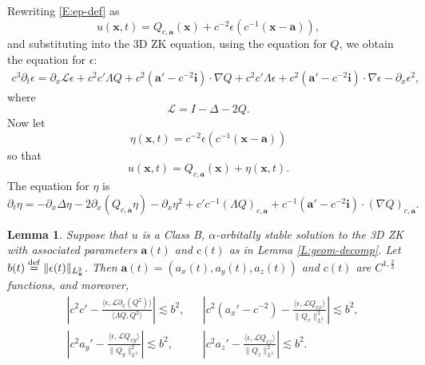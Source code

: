 \documentclass[12pt,letterpaper]{amsart}
\newcommand{\la}{\langle}
\newcommand{\ra}{\rangle}
\newcommand{\defeq}{\stackrel{\rm{def}}{=}}
\newtheorem{lemma}[theorem]{Lemma}
\theoremstyle{remark}
\numberwithin{equation}{section}
\numberwithin{theorem}{section}
\numberwithin{table}{section}
\begin{document}
Rewriting \eqref{E:ep-def} as
$$
u(\mathbf{x},t) = Q_{c,\mathbf{a}}(\mathbf{x}) + c^{-2}\epsilon(c^{-1}(\mathbf{x}-\mathbf{a})), 
$$
and substituting into the 3D ZK equation, using the equation for $Q$, we obtain the equation for $\epsilon$:
\begin{align} \label{ep-eq}
c^3 \partial_t \epsilon %
=  \partial_x \mathcal{L}\epsilon + c^2c' \Lambda Q + c^2(\mathbf{a}' - c^{-2} \mathbf{i}) \cdot \nabla Q %
+ c^2c' \Lambda \epsilon + c^2(\mathbf{a}' - c^{-2}\mathbf{i}) \cdot \nabla \epsilon  - \partial_x \epsilon^2,
\end{align}
where
$$
\mathcal{L} = I - \Delta - 2Q.
$$
Now let
\begin{equation}
\label{E:eta-def}
\eta(\mathbf{x},t) = c^{-2}\epsilon(c^{-1}(\mathbf{x}-\mathbf{a}))
\end{equation}
so that
$$
u(\mathbf{x},t) = Q_{c, \mathbf{a}}(\mathbf{x}) + \eta(\mathbf{x},t).
$$
The equation for $\eta$ is
\begin{equation}
\label{E:eta-eq}
\partial_t \eta = - \partial_x \Delta \eta - 2 \partial_x ( Q_{c,\mathbf{a}} \eta) - \partial_x \eta^2 + c'c^{-1} (\Lambda Q)_{c,\mathbf{a}} + c^{-1}(\mathbf{a}' - c^{-2} \mathbf{i}) \cdot (\nabla Q)_{c,\mathbf{a}}.
\end{equation}

\begin{lemma}
\label{L:ODE-bounds}
Suppose that $u$ is a Class B, $\alpha$-orbitally stable solution to the 3D ZK with associated parameters $\mathbf{a}(t)$ and $c(t)$ as in Lemma \ref{L:geom-decomp}.  Let $b(t) \defeq \|\epsilon(t) \|_{L_{\mathbf{x}}^2}$.   Then $\mathbf{a}(t)=(a_x(t),a_y(t),a_z(t))$ and $c(t)$ are $C^{1,\frac23}$ functions, and moreover,
\begin{equation}
\label{E:param-ODEs}
\begin{aligned}
&\left|c^2c' - \frac{\la \epsilon, \mathcal{L} \partial_x (Q^2)\ra}{ \la \Lambda Q, Q^2 \ra} \right| \lesssim b^2,  && 
\left| c^2(a_x' -c^{-2}) - \frac{ \la \epsilon, \mathcal{L} Q_{xx}\ra }{ \|Q_x\|_{L^2}^2 } \right| \lesssim b^2, \\
&\left| c^2a_y' - \frac{ \la \epsilon, \mathcal{L} Q_{xy}\ra }{ \|Q_y\|_{L^2}^2 } \right| \lesssim b^2, && 
\left| c^2a_z' - \frac{ \la \epsilon, \mathcal{L} Q_{xz}\ra }{ \|Q_z\|_{L^2}^2 } \right| \lesssim b^2.
\end{aligned}
\end{equation}
\end{lemma}
\end{document}

